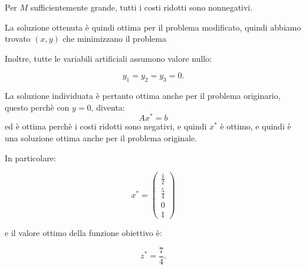 Per $M$ sufficientemente grande,
tutti i costi ridotti sono nonnegativi.

La soluzione ottenuta è quindi ottima
per il problema modificato, quindi abbiamo trovato $(x,y)$ che minimizzano il problema

Inoltre, tutte le variabili artificiali
assumono valore nullo:

\[
y_1=y_2=y_3=0.
\]

La soluzione individuata è pertanto
ottima anche per il problema originario, questo perchè con $y = 0$, diventa:
\[
Ax^* = b
\]
ed è ottima perchè i costi ridotti sono negativi, e quindi $x^*$ è ottimo, e quindi è una soluzione ottima anche per il problema originale.

In particolare:

\[
\boxed{
x^*=
\begin{pmatrix}
\frac12\\[2pt]
\frac54\\[2pt]
0\\[2pt]
1
\end{pmatrix}
}
\]

e il valore ottimo della funzione obiettivo è:

\[
\boxed{
z^*=\frac74.
}
\]
